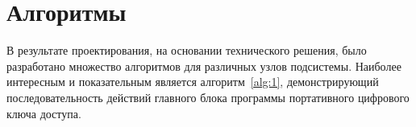 \section{Алгоритмы}

В результате проектирования, на основании технического решения, было разработано
множество алгоритмов для различных узлов подсистемы. Наиболее интересным и
показательным является алгоритм~\ref{alg:1}, демонстрирующий последовательность
действий главного блока программы портативного цифрового ключа доступа.